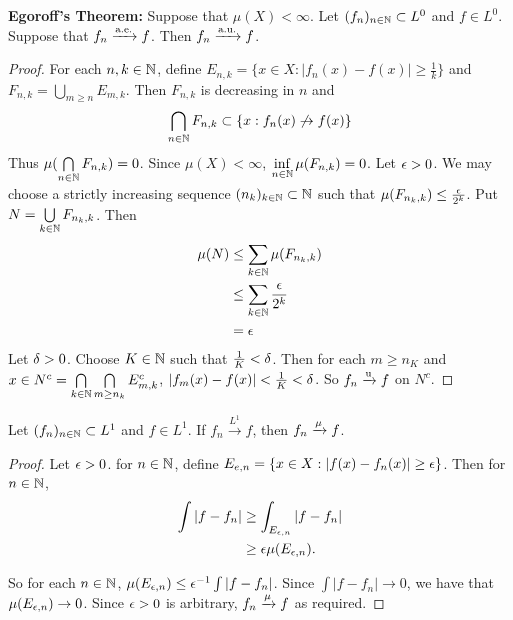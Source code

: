\documentclass{book}
\begin{document}
	\begin{ex}  \textbf{Egoroff's Theorem:}
		Suppose that $\mu(X) < \infty$. Let $(f_n)_{n \in \mathbb{N}} \subset L^0$ and $f \in L^0$. Suppose that $f_n \xrightarrow{\text{a.e.}} f$. Then $f_n \xrightarrow{\text{a.u.}} f$.
	\end{ex}
	
	\begin{proof}
		For each $n, k \in \mathbb{N}$, define $E_{n, k} = \{x \in X: | f_n(x) - f(x) | \geq \frac{1}{k} \}$ and $F_{n,k} = \bigcup\limits_{m \geq n}E_{m,k}$. Then $F_{n,k}$ is decreasing in $n$ and $$\bigcap\limits_{n \in \mathbb{N}}F_{n,k} \subset \{x: f_n(x) \not \rightarrow f(x)\}$$ 
		Thus $\mu(\bigcap\limits_{n \in \mathbb{N}}F_{n,k}) = 0$. Since $\mu(X) < \infty$, $\inf\limits_{n \in \mathbb{N}}\mu(F_{n,k}) = 0$. Let $\epsilon >0$. We may choose a strictly increasing sequence $(n_k)_{k \in \mathbb{N}} \subset \mathbb{N}$ such that  $\mu(F_{n_k,k}) \leq \frac{\epsilon}{2^{k}}$. Put $N = \bigcup\limits_{k \in \mathbb{N}}F_{n_k,k}$. Then 
		\begin{align*}
			\mu(N) 
			&\leq \sum\limits_{k \in \mathbb{N}}\mu(F_{n_k,k}) \\
			& \leq \sum\limits_{k \in \mathbb{N}} \frac{\epsilon}{2^k}\\
			& = \epsilon
		\end{align*} 
		Let $\delta > 0$. Choose $K \in \mathbb{N}$ such that $\frac{1}{K} < \delta$. Then for each $m \geq n_K$ and $x \in N^c =\bigcap\limits_{k \in \mathbb{N}}\bigcap\limits_{m \geq n_k}E_{m,k}^c$, $|f_m(x)- f(x)| < \frac{1}{K} < \delta$. So $f_n \xrightarrow{\text{u}} f$ on $N^c$. 
	\end{proof}
	
	\begin{ex}  
		Let $(f_n)_{n \in \mathbb{N}} \subset L^1$ and $f \in L^1$. If $f_n \xrightarrow{L^1}f$, then $f_n \xrightarrow{\mu} f$.
	\end{ex}
	
	\begin{proof}
		Let $\epsilon >0$. for $n \in \mathbb{N}$, define $E_{e,n} = \{x \in X: |f(x) - f_n(x)|\geq \epsilon\}$. Then for $n \in \mathbb{N}$,
		\begin{align*}
			\int |f - f_n|
			& \geq \int_{E_{\epsilon,n}} |f- f_n|\\
			& \geq \epsilon \mu(E_{\epsilon,n}).
		\end{align*}
		
		So for each $n \in \mathbb{N}$, $\mu(E_{\epsilon, n}) \leq \epsilon^{-1}\int |f - f_n|$. Since $\int |f - f_n| \rightarrow 0$, we have that $\mu(E_{\epsilon,n}) \rightarrow 0$. Since $\epsilon >0$ is arbitrary, $f_n \xrightarrow{\mu} f$ as required. 
	\end{proof}
	
\end{document}
